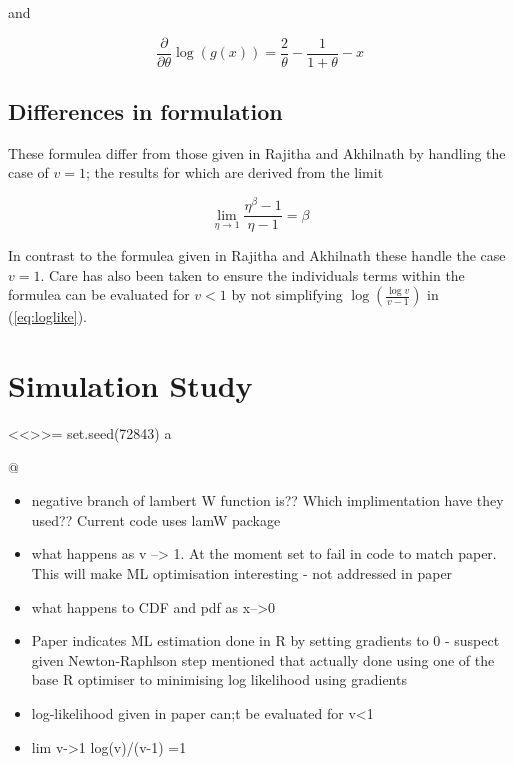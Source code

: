 and

\begin{equation}
\frac{\partial}{\partial \theta} \log \left( g\left(x\right) \right) = \frac{2}{\theta} - \frac{1}{1+\theta} -x
\end{equation}

\subsection{Differences in formulation}

These formulea differ from those given in Rajitha and Akhilnath\supercite{Rajitha2002} by handling the case of $v=1$; the results for which are derived from the limit

\begin{equation}
  \lim_{\eta \rightarrow 1} \frac{\eta^\beta -1}{\eta-1} = \beta
\end{equation}


In contrast to the formulea given in Rajitha and Akhilnath\supercite{Rajitha2022} these handle the case $v=1$. Care has also been taken to ensure the individuals terms within the formulea can be evaluated for $v<1$ by not simplifying $\log\left(\frac{\log v}{v-1}\right)$ in (\ref{eq:loglike}).


\section{Simulation Study}
\label{sec:sim}

<<>>=
set.seed(72843)
a

@




\begin{itemize}
\item{negative branch of lambert W function is?? Which implimentation have they used?? Current code uses lamW package}
\item{what happens as v --> 1. At the moment set to fail in code to match paper. This will make ML optimisation interesting - not addressed in paper}
\item{what happens to CDF and pdf as x-->0}
\item{Paper indicates ML estimation done in R by setting gradients to 0 - suspect given Newton-Raphlson step mentioned that actually done using one of the base R optimiser to minimising log likelihood using gradients}
\item{log-likelihood given in paper can;t be evaluated for v<1}
\item{lim v->1 log(v)/(v-1) =1}
\end{itemize}






